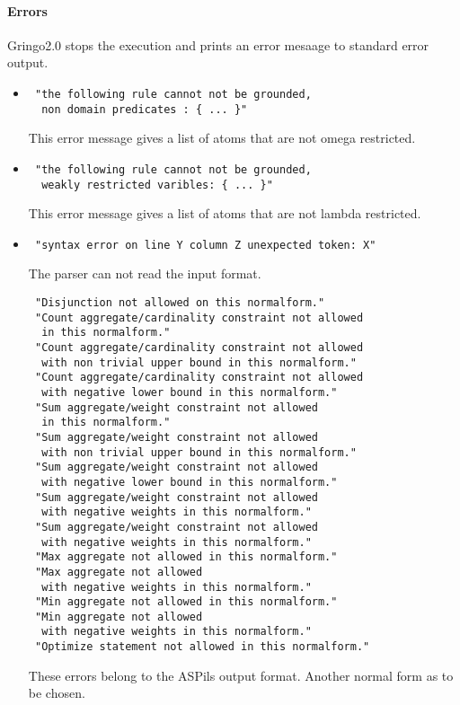 \documentclass[a4paper,10pt]{article}
\begin{document}
\paragraph{Errors}
Gringo2.0 stops the execution and prints an error mesaage to standard error output.
\begin{itemize}
 \item 
\begin{verbatim}
 "the following rule cannot not be grounded,
  non domain predicates : { ... }"
\end{verbatim}
This error message gives a list of atoms that are not omega restricted.
 \item 
\begin{verbatim}
 "the following rule cannot not be grounded,
  weakly restricted varibles: { ... }"
\end{verbatim}
This error message gives a list of atoms that are not lambda restricted. 
\item
\begin{verbatim}
 "syntax error on line Y column Z unexpected token: X"
\end{verbatim}
The parser can not read the input format.
\begin{verbatim}
 "Disjunction not allowed on this normalform."
 "Count aggregate/cardinality constraint not allowed
  in this normalform."
 "Count aggregate/cardinality constraint not allowed 
  with non trivial upper bound in this normalform."
 "Count aggregate/cardinality constraint not allowed 
  with negative lower bound in this normalform."
 "Sum aggregate/weight constraint not allowed
  in this normalform."
 "Sum aggregate/weight constraint not allowed 
  with non trivial upper bound in this normalform."
 "Sum aggregate/weight constraint not allowed 
  with negative lower bound in this normalform."
 "Sum aggregate/weight constraint not allowed
  with negative weights in this normalform."
 "Sum aggregate/weight constraint not allowed
  with negative weights in this normalform."
 "Max aggregate not allowed in this normalform."
 "Max aggregate not allowed
  with negative weights in this normalform."
 "Min aggregate not allowed in this normalform."
 "Min aggregate not allowed 
  with negative weights in this normalform."
 "Optimize statement not allowed in this normalform."
\end{verbatim}
These errors belong to the ASPils output format. Another normal form as to be chosen.
\end{itemize}
\end{document}

